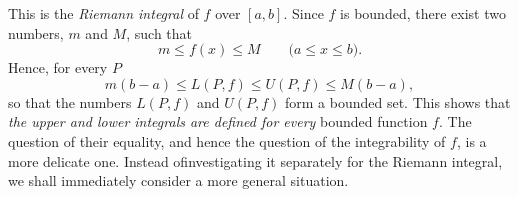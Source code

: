 \begin{definition}
    This is the \emph{Riemann integral} of \(f\) over \(\left[a,b\right]\). Since \(f\) is bounded, there exist two numbers, \(m\) and \(M\), such that
    \begin{equation*}
        m\leqslant f\left(x\right)\leqslant M\qquad\text{(\(a\leqslant x\leqslant b\))}.
    \end{equation*}
    Hence, for every \(P\)
    \begin{equation*}
        m\left(b-a\right)\leqslant L\left(P,f\right)\leqslant U\left(P,f\right)\leqslant M\left(b-a\right),
    \end{equation*}
    so that the numbers \(L\left(P,f\right)\) and \(U\left(P,f\right)\) form a bounded set. This shows that \emph{the upper and lower integrals are defined for every} bounded function \(f\). The question of their equality, and hence the question of the integrability of \(f\), is a more delicate one. Instead ofinvestigating it separately for the Riemann integral, we shall immediately consider a more general situation.
\end{definition}

